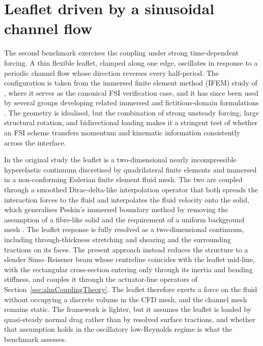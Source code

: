 \section{Leaflet driven by a sinusoidal channel flow}
\label{sec:leaflet}

\noindent
The second benchmark exercises the coupling under strong time-dependent forcing. A thin flexible leaflet, clamped along one edge, oscillates in response to a periodic channel flow whose direction reverses every half-period. The configuration is taken from the immersed finite element method (IFEM) study of \citet{zhang_immersed_2007}, where it serves as the canonical FSI verification case, and it has since been used by several groups developing related immersed and fictitious-domain formulations \citep{baaijens_fictitiousdomain_2001,de_hart_threedimensional_2003,zhang_immersed_2012,roy_benchmarking_2015}. The geometry is idealised, but the combination of strong unsteady forcing, large structural rotation, and bidirectional loading makes it a stringent test of whether an FSI scheme transfers momentum and kinematic information consistently across the interface.

\noindent
In the original study the leaflet is a two-dimensional nearly incompressible hyperelastic continuum discretised by quadrilateral finite elements and immersed in a non-conforming Eulerian finite element fluid mesh. The two are coupled through a smoothed Dirac-delta-like interpolation operator that both spreads the interaction forces to the fluid and interpolates the fluid velocity onto the solid, which generalises Peskin's immersed boundary method \citep{peskin_immersed_2002} by removing the assumption of a fibre-like solid and the requirement of a uniform background mesh \citep{de_hart_threedimensional_2003}. The leaflet response is fully resolved as a two-dimensional continuum, including through-thickness stretching and shearing and the surrounding tractions on its faces. The present approach instead reduces the structure to a slender Simo--Reissner beam whose centreline coincides with the leaflet mid-line, with the rectangular cross-section entering only through its inertia and bending stiffness, and couples it through the actuator-line operators of Section~\ref{sec:almCouplingTheory}. The leaflet therefore exerts a force on the fluid without occupying a discrete volume in the CFD mesh, and the channel mesh remains static. The framework is lighter, but it assumes the leaflet is loaded by quasi-steady normal drag rather than by resolved surface tractions, and whether that assumption holds in the oscillatory low-Reynolds regime is what the benchmark assesses.

